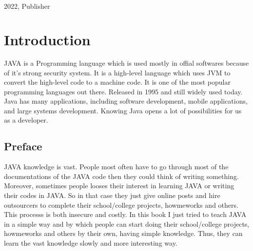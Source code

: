 \documentclass[openany]{book}  %
\begin{document}
\begin{flushleft}
\begin{titlepage}
{\begin{verbatim}
                                                                                                      
                                                                                                      
        \end{verbatim}
        }
        \vfill
        {\small{2022, Publisher}}
    \end{titlepage}


    \pagecolor{smokeWhite}
    \color{black}
    \newpage
    \tableofcontents
    \newpage
    \listoffigures
    \newpage
    \listoftables
    \newpage

    \part{Introduction}
    JAVA\cite{Ref1} is a Programming language which is used mostly in offial softwares because of it's strong security system.
    It is a high-level language which uses JVM to convert the high-level code to a machine code.
    It is one of the most popular programming languages out there. Released in 1995 and still widely used today.
    Java has many applications, including software development, mobile applications, and large systems development.
    Knowing Java opens a lot of possibilities for us as a developer.

    \chapter*{Preface}
    JAVA\cite{Ref1} knowledge is vast. People most often have to go through most of the documentations of the JAVA code then they could think of writing something.
    Moreover, sometimes people looses their interest in learning JAVA or writing their codes in JAVA. So in that case they just give online posts
    and hire outsourcers to complete their school/college projects, howmeworks and others.
    This processs is both insecure and costly. In this book I just tried to teach JAVA in a simple way and by which
    people can start doing their school/college projects, howmeworks and others by their own, having simple knowledge. Thus, they can learn the vast knowledge slowly and more interesting way.


\end{flushleft}
\end{document}
